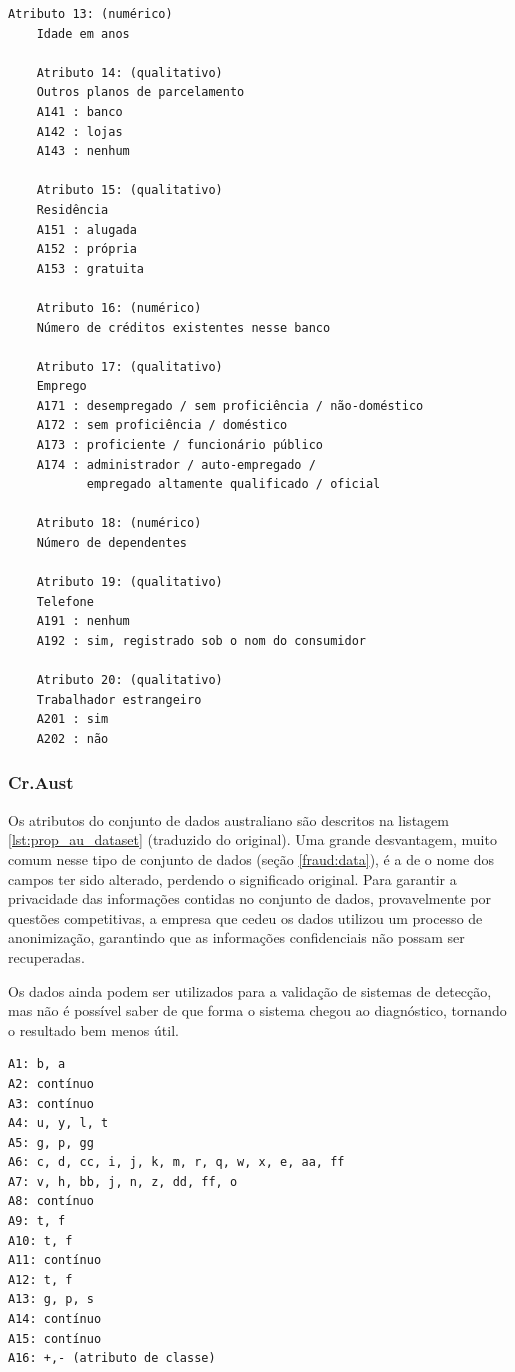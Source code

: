 \begin{lstlisting}[caption=Atributos do conjunto de dados alemão,label=lst:ge_dataset]
    Atributo 13: (numérico)
    Idade em anos

    Atributo 14: (qualitativo)
    Outros planos de parcelamento
    A141 : banco
    A142 : lojas
    A143 : nenhum

    Atributo 15: (qualitativo)
    Residência
    A151 : alugada
    A152 : própria
    A153 : gratuita

    Atributo 16: (numérico)
    Número de créditos existentes nesse banco

    Atributo 17: (qualitativo)
    Emprego
    A171 : desempregado / sem proficiência / não-doméstico
    A172 : sem proficiência / doméstico
    A173 : proficiente / funcionário público
    A174 : administrador / auto-empregado /
           empregado altamente qualificado / oficial

    Atributo 18: (numérico)
    Número de dependentes

    Atributo 19: (qualitativo)
    Telefone
    A191 : nenhum
    A192 : sim, registrado sob o nom do consumidor

    Atributo 20: (qualitativo)
    Trabalhador estrangeiro
    A201 : sim
    A202 : não
\end{lstlisting}

\subsubsection{Cr.Aust}

Os atributos do conjunto de dados australiano são descritos na listagem \ref{lst:prop_au_dataset} (traduzido do original). Uma grande desvantagem, muito comum nesse tipo de conjunto de dados (seção \ref{fraud:data}), é a de o nome dos campos ter sido alterado, perdendo o significado original. Para garantir a privacidade das informações contidas no conjunto de dados, provavelmente por questões competitivas, a empresa que cedeu os dados utilizou um processo de anonimização, garantindo que as informações confidenciais não possam ser recuperadas.

Os dados ainda podem ser utilizados para a validação de sistemas de detecção, mas não é possível saber de que forma o sistema chegou ao diagnóstico, tornando o resultado bem menos útil.

\vspace{1cm}
\begin{lstlisting}[caption=Atributos do conjunto de dados Cr.Aust, label=lst:prop_au_dataset]
A1: b, a
A2: contínuo
A3: contínuo
A4: u, y, l, t
A5: g, p, gg
A6: c, d, cc, i, j, k, m, r, q, w, x, e, aa, ff
A7: v, h, bb, j, n, z, dd, ff, o
A8: contínuo
A9: t, f
A10: t, f
A11: contínuo
A12: t, f
A13: g, p, s
A14: contínuo
A15: contínuo
A16: +,- (atributo de classe)
\end{lstlisting}

